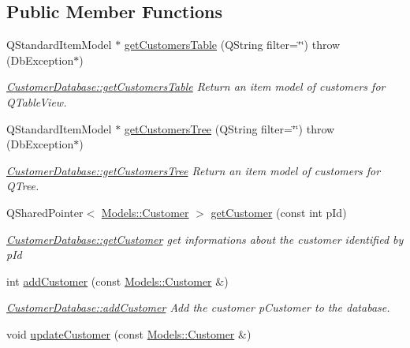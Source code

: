 \subsection*{Public Member Functions}
\begin{DoxyCompactItemize}
\item 
Q\+Standard\+Item\+Model $\ast$ \hyperlink{classDatabase_1_1CustomerDatabase_a03110432af547dbe5447c51392cae53a}{get\+Customers\+Table} (Q\+String filter=\char`\"{}\char`\"{})  throw (\+Db\+Exception$\ast$)
\begin{DoxyCompactList}\small\item\em \hyperlink{classDatabase_1_1CustomerDatabase_a03110432af547dbe5447c51392cae53a}{Customer\+Database\+::get\+Customers\+Table} Return an item model of customers for Q\+Table\+View. \end{DoxyCompactList}\item 
Q\+Standard\+Item\+Model $\ast$ \hyperlink{classDatabase_1_1CustomerDatabase_a158c95d767ccf6f4345dd54854088e4f}{get\+Customers\+Tree} (Q\+String filter=\char`\"{}\char`\"{})  throw (\+Db\+Exception$\ast$)
\begin{DoxyCompactList}\small\item\em \hyperlink{classDatabase_1_1CustomerDatabase_a158c95d767ccf6f4345dd54854088e4f}{Customer\+Database\+::get\+Customers\+Tree} Return an item model of customers for Q\+Tree. \end{DoxyCompactList}\item 
Q\+Shared\+Pointer$<$ \hyperlink{classModels_1_1Customer}{Models\+::\+Customer} $>$ \hyperlink{classDatabase_1_1CustomerDatabase_a997eac5e1a9e4d27a4380d10e8f8d935}{get\+Customer} (const int p\+Id)
\begin{DoxyCompactList}\small\item\em \hyperlink{classDatabase_1_1CustomerDatabase_a997eac5e1a9e4d27a4380d10e8f8d935}{Customer\+Database\+::get\+Customer} get informations about the customer identified by {\itshape p\+Id} \end{DoxyCompactList}\item 
int \hyperlink{classDatabase_1_1CustomerDatabase_a10331f3013c56e9d9140d9c2e6d64b30}{add\+Customer} (const \hyperlink{classModels_1_1Customer}{Models\+::\+Customer} \&)
\begin{DoxyCompactList}\small\item\em \hyperlink{classDatabase_1_1CustomerDatabase_a10331f3013c56e9d9140d9c2e6d64b30}{Customer\+Database\+::add\+Customer} Add the customer {\itshape p\+Customer} to the database. \end{DoxyCompactList}\item 
\hypertarget{classDatabase_1_1CustomerDatabase_a8408b97565455420fe062b5d62c19088}{void \hyperlink{classDatabase_1_1CustomerDatabase_a8408b97565455420fe062b5d62c19088}{update\+Customer} (const \hyperlink{classModels_1_1Customer}{Models\+::\+Customer} \&)}\label{classDatabase_1_1CustomerDatabase_a8408b97565455420fe062b5d62c19088}


\end{DoxyCompactItemize}
